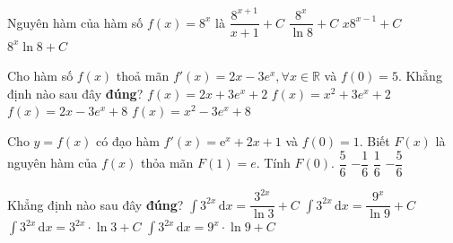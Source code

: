 \begin{ex}%
	Nguyên hàm của  hàm số $f(x)=8^{x}$ là
	 \choice
		 {$\dfrac{8^{x+1}}{x+1}+C$}
		{\True $\dfrac{8^{x}}{\ln  8}+C$}
		{$x8^{x-1}+C$} 
		{$8^{x}\ln  8+C$}
\end{ex}

\begin{ex}%
	Cho hàm số $f(x)$ thoả mãn $f'(x)=2x-3e^x, \forall x \in \mathbb{R}$ và $f(0)=5$. Khẳng định  nào sau đây \textbf{đúng}?
	\choice 
		 {$f(x)=2x+3e^x+2$}
		 {$f(x)=x^2+3e^x+2$}
		{$f(x)=2x-3e^x+8$} 
		 {\True $f(x)=x^2-3e^x+8$}
\end{ex}

\begin{ex}%
	Cho $y=f(x)$ có đạo  hàm $f'(x)=\mathrm{e}^x+2x+1$ và $f(0)=1$. Biết $F(x)$ là nguyên hàm của $f(x)$ thỏa mãn $F(1)=e$. Tính $F(0)$.
	 \choice
		 {$\dfrac{5}{6}$}
		 {$-\dfrac{1}{6}$}
		 {\True $\dfrac{1}{6}$}
		{$-\dfrac{5}{6}$} 
\end{ex}

\begin{ex}%
	Khẳng định nào  sau đây \textbf{đúng}?
	\choice 
		{$\displaystyle\int 3^{2x} \mathrm{\,d}x=\dfrac{3^{2x}}{\ln 3}+C$} 
		 {\True $\displaystyle\int 3^{2x} \mathrm{\,d}x=\dfrac{9^x}{\ln 9}+C$}
		{$\displaystyle\int 3^{2x}  \mathrm{\,d}x=3^{2x} \cdot \ln 3+C$}
		{$\displaystyle\int 3^{2x}  \mathrm{\,d}x=9^x \cdot \ln 9+C$}
\end{ex}

